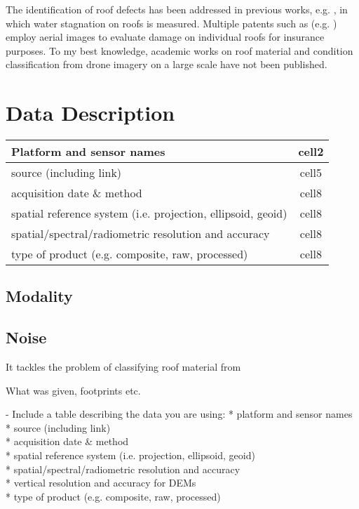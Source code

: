 \documentclass[11pt]{article}
\begin{document}
	The identification of roof defects has been addressed in previous works, e.g. \cite{Yudin2018}, in which water stagnation on roofs is measured. Multiple patents such as (e.g. \cite{Shreve2017}) employ aerial images to evaluate damage on individual roofs for insurance purposes. To my best knowledge, academic works on roof material and condition classification from drone imagery on a large scale have not been published. 
	
	\section{Data Description}
	
	
	
	\begin{center}
		\begin{tabular}{ |l|c| } 
			\hline
			Platform and sensor names & cell2  \\ 
			\hline
			source (including link) & cell5 \\ 
			\hline
			acquisition date \& method & cell8  \\ 
			\hline
			spatial reference system (i.e. projection, ellipsoid, geoid) & cell8  \\ 
			\hline
			spatial/spectral/radiometric resolution and accuracy & cell8  \\ 
			\hline
			type of product (e.g. composite, raw, processed)& cell8  \\ 
			\hline
		\end{tabular}
	\end{center}
	
	
	
	\subsection{Modality}
	
	\subsection{Noise}
	
		 It tackles the problem of classifying roof material from 
	
	What was given, footprints etc.
	
	- Include a table describing the data you are using:
	* platform and sensor names \\
	* source (including link) \\
	* acquisition date \& method \\
	* spatial reference system (i.e. projection, ellipsoid, geoid) \\
	* spatial/spectral/radiometric resolution and accuracy \\
	* vertical resolution and accuracy for DEMs \\
	* type of product (e.g. composite, raw, processed) 
	
\end{document}
